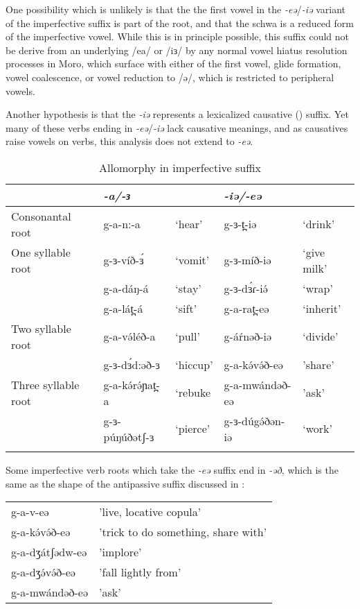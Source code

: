 One possibility which is unlikely is that the the first vowel in the \textit{-eə}/\textit{-iə} variant of the imperfective suffix is part of the root, and that the schwa is a reduced form of the imperfective vowel. While this is in principle possible, this suffix could not be derive from an underlying /ea/ or /iɜ/ by any normal vowel hiatus resolution processes in Moro, which surface with either of the first vowel, glide formation, vowel coalescence, or vowel reduction to /ə/, which is restricted to peripheral vowels.

Another hypothesis is that the \textit{-iə} represents a lexicalized causative () suffix. Yet many of these verbs ending in \textit{-eə}/\textit{-iə} lack causative meanings, and as causatives raise vowels on verbs, this analysis does not extend to \textit{-eə}.

 	\begin{table}
 		\begin{tabular}[t]{lllll}
\lsptoprule
	& \textit{-a/-ɜ}  &  & 	\textit{-iə/-eə} & \\
\midrule
Consonantal root& g-a-n:-a	&	‘hear’ & g-ɜ-t̪-iə	&	‘drink’\\
One syllable root	& g-ɜ-víð-ɜ́	&	‘vomit’	&  g-ɜ-míð-iə	&	‘give milk’ \\
& 	g-a-dáŋ-á	&	‘stay’	& g-ɜ-dɜ́ɾ-iə́	&	‘wrap’  \\ 
	& g-a-lát̪-á	&	‘sift’	& g-a-rat̪-eə	&	‘inherit’ \\ 
Two syllable root	& g-a-və́léð-a & ‘pull’	& g-áŕnəð-iə	&	`divide'\\
	& g-ɜ-dɜ́d:əð-ɜ	&	`hiccup' & g-a-kə́və́ð-eə		&	'share'  \\ 
Three syllable root	& g-a-kə́rə́ɲat̪-a		&	`rebuke &  g-a-mwándəð-eə	& 'ask'\\
	& g-ɜ-púŋúðətʃ-ɜ	&	`pierce'	&  g-ɜ-dúgə́ðən-iə	&	`work' \\ 
\lspbottomrule
\end{tabular}
	\caption{Allomorphy in imperfective suffix}
		\label{tab:ch11:ipfvfv}
\end{table}


Some imperfective verb roots which take the \textit{-eə} suffix end in \textit{-əð}, which is the same as the shape of the antipassive suffix discussed in :

\ea 	
\begin{tabular}[t]{ll}
g-a-v-eə		&	'live, locative copula'\\
g-a-kə́və́ð-eə		&	'trick to do something, share with'\\
g-a-dʒátʃədw-eə	&	'implore'\\
g-a-dʒə́və́ð-eə		&	'fall lightly from'\\
g-a-mwándəð-eə	&	'ask' \\	
\end{tabular}
\z 

